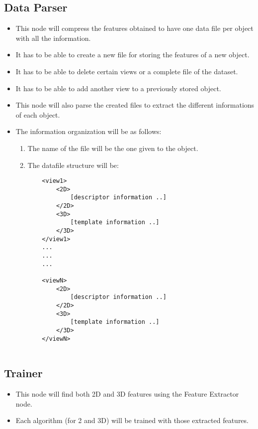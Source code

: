\documentclass{article}
\begin{document}
\subsection{Data Parser}
\begin{itemize}
\item This node will compress the features obtained to have one data file per object with all the information.
 
\item It has to be able to create a new file for storing the features of a new object. 
\item It has to be able to delete certain views or a complete file of the dataset. 
\item It has to be able to add another view to a previously stored object. 

\item This node will also parse the created files to extract the different informations of each object. 

\item The information organization will be as follows: 
	\begin{enumerate}
	\item The name of the file will be the one given to the object. 
	\item The datafile structure will be: \\
		\begin{lstlisting}
	<view1>
		<2D>
			[descriptor information ..]
		</2D>
		<3D>
			[template information ..]
		</3D>
	</view1>	
	...
	...
	...		
			
	<viewN>
		<2D>
			[descriptor information ..]
		</2D>
		<3D>
			[template information ..]
		</3D>
	</viewN>	
		
		\end{lstlisting}
	\end{enumerate}
	
\end{itemize}

\subsection{Trainer}
\begin{itemize}
	\item This node will find both 2D and 3D features using the Feature Extractor node. 
	\item Each algorithm (for 2 and 3D) will be trained with those extracted features. 
\end{itemize}
\end{document}
